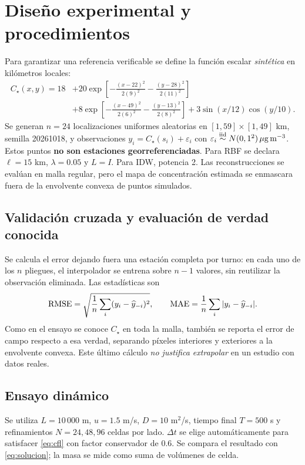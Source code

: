 \section{Diseño experimental y procedimientos}\label{sec:diseno}
Para garantizar una referencia verificable se define la función escalar \emph{sintética} en kilómetros locales:
\begin{align}
C_\star(x,y)=18&+20\exp\left[-\frac{(x-22)^2}{2(9)^2}-\frac{(y-28)^2}{2(11)^2}\right]\\
&+8\exp\left[-\frac{(x-49)^2}{2(6)^2}-\frac{(y-13)^2}{2(8)^2}\right]+3\sin(x/12)\cos(y/10).\label{eq:sintetica}
\end{align}
Se generan $n=24$ localizaciones uniformes aleatorias en $[1,59]\times[1,49]$ km, semilla 20261018, y observaciones $y_i=C_\star(s_i)+\varepsilon_i$ con $\varepsilon_i\stackrel{\mathrm{iid}}\sim N(0,1^2)\,\mu\mathrm{g}\,\mathrm{m}^{-3}$. Estos puntos \textbf{no son estaciones georreferenciadas}. Para RBF se declara $\ell=15$ km, $\lambda=0.05$ y $L=I$. Para IDW, potencia 2. Las reconstrucciones se evalúan en malla regular, pero el mapa de concentración estimada se enmascara fuera de la envolvente convexa de puntos simulados.

\subsection{Validación cruzada y evaluación de verdad conocida}
Se calcula el error dejando fuera una estación completa por turno: en cada uno de los $n$ pliegues, el interpolador se entrena sobre $n-1$ valores, sin reutilizar la observación eliminada. Las estadísticas son
\begin{equation}\mathrm{RMSE}=\sqrt{\frac1n\sum_i(y_i-\widehat y_{-i})^2},\qquad\mathrm{MAE}=\frac1n\sum_i|y_i-\widehat y_{-i}|.\label{eq:rmse}\end{equation}
Como en el ensayo se conoce $C_\star$ en toda la malla, también se reporta el error de campo respecto a esa verdad, separando píxeles interiores y exteriores a la envolvente convexa. Este último cálculo \emph{no justifica extrapolar} en un estudio con datos reales.

\subsection{Ensayo dinámico}
Se utiliza $L=10\,000$ m, $u=1.5$ m/s, $D=10$ m$^2$/s, tiempo final $T=500$ s y refinamientos $N=24,48,96$ celdas por lado. $\Delta t$ se elige automáticamente para satisfacer \eqref{eq:cfl} con factor conservador de 0.6. Se compara el resultado con \eqref{eq:solucion}; la masa se mide como suma de volúmenes de celda.


